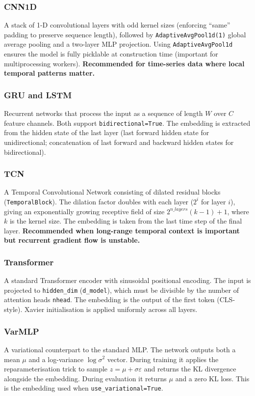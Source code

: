 \documentclass[12pt]{article}
\newcommand{\api}[1]{\texttt{#1}}
\begin{document}
\subsubsection{CNN1D}
A stack of 1-D convolutional layers with odd kernel sizes (enforcing
``same'' padding to preserve sequence length), followed by
\api{AdaptiveAvgPool1d(1)} global average pooling and a two-layer MLP
projection.  Using \api{AdaptiveAvgPool1d} ensures the model is fully
picklable at construction time (important for multiprocessing workers).
\textbf{Recommended for time-series data where local temporal patterns
matter.}

\subsubsection{GRU and LSTM}
Recurrent networks that process the input as a sequence of length $W$
over $C$ feature channels.  Both support \api{bidirectional=True}.  The
embedding is extracted from the hidden state of the last layer (last
forward hidden state for unidirectional; concatenation of last forward
and backward hidden states for bidirectional).

\subsubsection{TCN}
A Temporal Convolutional Network consisting of dilated residual blocks
(\api{TemporalBlock}).  The dilation factor doubles with each layer
($2^i$ for layer $i$), giving an exponentially growing receptive field
of size $2^{n\_layers}(k-1)+1$, where $k$ is the kernel size.  The
embedding is taken from the last time step of the final layer.
\textbf{Recommended when long-range temporal context is important but
recurrent gradient flow is unstable.}

\subsubsection{Transformer}
A standard Transformer encoder with sinusoidal positional encoding.
The input is projected to \api{hidden\_dim} (\api{d\_model}), which must
be divisible by the number of attention heads \api{nhead}.  The embedding
is the output of the first token (CLS-style).  Xavier initialisation is
applied uniformly across all layers.

\subsubsection{VarMLP}
A variational counterpart to the standard MLP.  The network outputs both
a mean $\mu$ and a log-variance $\log\sigma^2$ vector.  During training
it applies the reparameterisation trick to sample $z = \mu + \sigma\varepsilon$
and returns the KL divergence alongside the embedding.  During evaluation
it returns $\mu$ and a zero KL loss.  This is the embedding used when
\api{use\_variational=True}.
\end{document}
